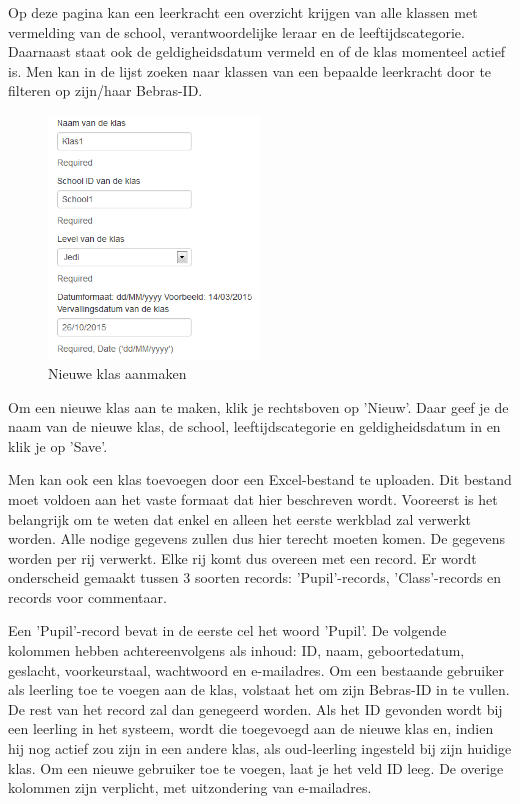 \documentclass[]{article}
\begin{document}
Op deze pagina kan een leerkracht een overzicht krijgen van alle klassen met vermelding van de school, verantwoordelijke leraar en de leeftijdscategorie. Daarnaast staat ook de geldigheidsdatum vermeld en of de klas momenteel actief is.
Men kan in de lijst zoeken naar klassen van een bepaalde leerkracht door te filteren op zijn/haar Bebras-ID.

\begin{figure}[!ht]
	\centering
	\includegraphics[width=0.5\textwidth]{img/new_class}
	\caption{Nieuwe klas aanmaken}
	\label{new_class}
\end{figure}

Om een nieuwe klas aan te maken, klik je rechtsboven op 'Nieuw'. Daar geef je de naam van de nieuwe klas, de school, leeftijdscategorie en geldigheidsdatum in en klik je op 'Save'.

Men kan ook een klas toevoegen door een Excel-bestand te uploaden. Dit bestand moet voldoen aan het vaste formaat dat hier beschreven wordt. 
Vooreerst is het belangrijk om te weten dat enkel en alleen het eerste werkblad zal verwerkt worden. Alle nodige gegevens zullen dus hier terecht moeten komen. De gegevens worden per rij verwerkt. Elke rij komt dus overeen met een record. Er wordt onderscheid gemaakt tussen 3 soorten records: 'Pupil'-records, 'Class'-records en records voor commentaar.

Een 'Pupil'-record bevat in de eerste cel het woord 'Pupil'. De volgende kolommen hebben achtereenvolgens als inhoud: ID, naam, geboortedatum, geslacht, voorkeurstaal, wachtwoord en e-mailadres. Om een bestaande gebruiker als leerling toe te voegen aan de klas, volstaat het om zijn Bebras-ID in te vullen. De rest van het record zal dan genegeerd worden. Als het ID gevonden wordt bij een leerling in het systeem, wordt die toegevoegd aan de nieuwe klas en, indien hij nog actief zou zijn in een andere klas, als oud-leerling ingesteld bij zijn huidige klas.  
Om een nieuwe gebruiker toe te voegen, laat je het veld ID leeg. De overige kolommen zijn verplicht, met uitzondering van e-mailadres.
\end{document}
